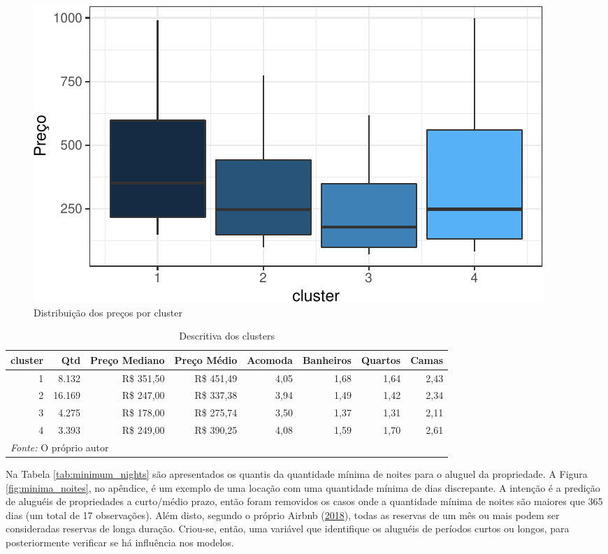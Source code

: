 \documentclass[
	12pt,				%
	a4paper,		%
	oneside,    %
	chapter=TITLE,		   %
	section=TITLE,		   %
	subsection=TITLE,	   %
	subsubsection=TITLE, %
	english,			%
	french,				%
	spanish,			%
	brazil,				%
]{abntex2}
\begin{document}
\begin{figure}
\centering
\includegraphics{00-TCC_files/figure-latex/boxplot_cluster-1.pdf}
\caption{\label{boxplot_cluster}Distribuição dos preços por cluster}
\end{figure}

\begin{table}

\caption{\label{tab:resumo_cluster}Descritiva dos clusters}
\centering
\begin{tabular}[t]{r|r|r|r|r|r|r|r}
\hline
cluster & Qtd & Preço Mediano & Preço Médio & Acomoda & Banheiros & Quartos & Camas\\
\hline
1 & 8.132 & R\$ 351,50 & R\$ 451,49 & 4,05 & 1,68 & 1,64 & 2,43\\
\hline
2 & 16.169 & R\$ 247,00 & R\$ 337,38 & 3,94 & 1,49 & 1,42 & 2,34\\
\hline
3 & 4.275 & R\$ 178,00 & R\$ 275,74 & 3,50 & 1,37 & 1,31 & 2,11\\
\hline
4 & 3.393 & R\$ 249,00 & R\$ 390,25 & 4,08 & 1,59 & 1,70 & 2,61\\
\hline
\multicolumn{8}{l}{\textit{Fonte: } O próprio autor}\\
\end{tabular}
\end{table}

Na Tabela \ref{tab:minimum_nights} são apresentados os quantis da
quantidade mínima de noites para o aluguel da propriedade. A Figura
\ref{fig:minima_noites}, no apêndice, é um exemplo de uma locação com
uma quantidade mínima de dias discrepante. A intenção é a predição de
aluguéis de propriedades a curto/médio prazo, então foram removidos os
casos onde a quantidade mínima de noites são maiores que 365 dias (um
total de 17 observações). Além disto, segundo o próprio Airbnb
(\protect\hyperlink{ref-airbnbperiodolongo}{2018}), todas as reservas de
um mês ou mais podem ser consideradas reservas de longa duração.
Criou-se, então, uma variável que identifique os aluguéis de períodos
curtos ou longos, para posteriormente verificar se há influência nos
modelos.
\end{document}
